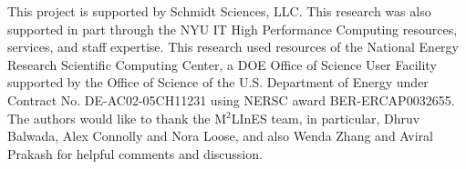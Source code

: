 \documentclass[draft]{agujournal2019}
\begin{document}
\acknowledgments
This project is supported by Schmidt Sciences, LLC. This research was also supported in part through the NYU IT High Performance
Computing resources, services, and staff expertise. This research used resources of the National Energy Research Scientific Computing Center, a DOE Office of Science User Facility supported by the Office of Science of the U.S. Department of Energy under Contract No. DE-AC02-05CH11231 using NERSC award BER-ERCAP0032655. The authors would like to thank the M$^2$LInES team, in particular, Dhruv Balwada, Alex Connolly and Nora Loose, and also Wenda Zhang and Aviral Prakash for helpful comments and discussion. %
%
%

%






%
%
%
%
%
\end{document}
